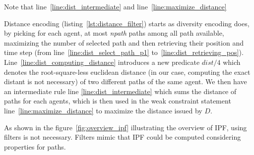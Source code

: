 Note that line~\ref{line:dist_intermediate} and line~\ref{line:maximize_distance}


Distance encoding (listing~\ref{lst:distance_filter}) starts as diversity encoding does, by picking for each agent, at most \textit{npath} paths among all path available, maximizing the number of selected path and then retrieving their position and time step (from line~\ref{line:dist_select_path_p1} to~\ref{line:dist_retrieving_pos}). Line~\ref{line:dist_computing_distance} introduces a new predicate \(dist/4\) which denotes the root-square-less euclidean distance (in our case, computing the exact distant is not necessary) of two different paths of the same agent. We then have an intermediate rule line \ref{line:dist_intermediate} which sums the distance of paths for each agents, which is then used in the weak constraint statement line~\ref{line:maximize_distance} to maximize the distance issued by \(D\).

As shown in the figure~\ref{fig:overview_ipf} illustrating the overview of IPF, using filters is not necessary. Filters mimic that IPF could be computed considering properties for paths.
